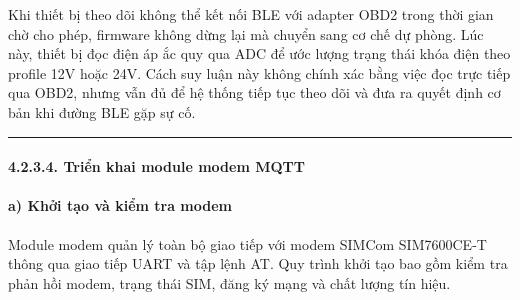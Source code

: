 \documentclass[a4paper]{extarticle}
\begin{document}
Khi thiết bị theo dõi không thể kết nối BLE với adapter OBD2 trong thời gian chờ
cho phép, firmware không dừng lại mà chuyển sang cơ chế dự phòng. Lúc
này, thiết bị đọc điện áp ắc quy qua ADC để ước lượng trạng thái khóa
điện theo profile 12V hoặc 24V. Cách suy luận này không chính xác bằng
việc đọc trực tiếp qua OBD2, nhưng vẫn đủ để hệ thống tiếp tục theo dõi
và đưa ra quyết định cơ bản khi đường BLE gặp sự cố.

\begin{center}\rule{0.5\linewidth}{0.5pt}\end{center}

\paragraph{4.2.3.4. Triển khai module modem
MQTT}\label{4234-triux1ec3n-khai-module-modem-mqtt}

\paragraph{a) Khởi tạo và kiểm tra
modem}\label{a-khux1edfi-tux1ea1o-vuxe0-kiux1ec3m-tra-modem}

Module modem quản lý toàn bộ giao tiếp với modem SIMCom SIM7600CE-T
thông qua giao tiếp UART và tập lệnh AT. Quy trình khởi tạo bao gồm kiểm
tra phản hồi modem, trạng thái SIM, đăng ký mạng và chất lượng tín hiệu.
\end{document}
